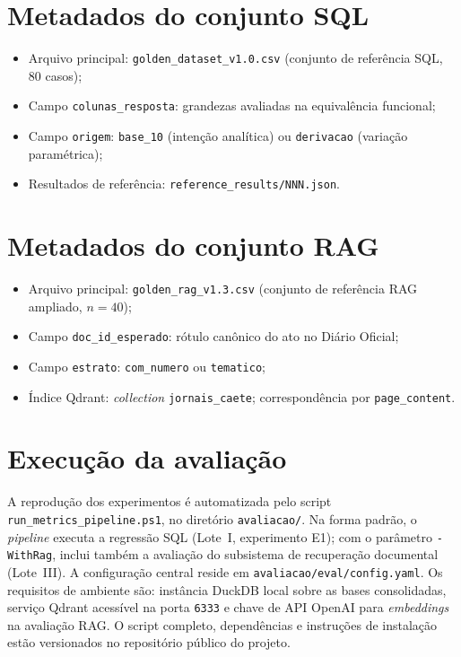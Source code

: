 \section{Metadados do conjunto SQL}

\begin{itemize}
    \item Arquivo principal: \texttt{golden\_dataset\_v1.0.csv} (conjunto de referência SQL, 80 casos);
    \item Campo \texttt{colunas\_resposta}: grandezas avaliadas na equivalência funcional;
    \item Campo \texttt{origem}: \texttt{base\_10} (intenção analítica) ou \texttt{derivacao} (variação paramétrica);
    \item Resultados de referência: \texttt{reference\_results/NNN.json}.
\end{itemize}

\section{Metadados do conjunto RAG}

\begin{itemize}
    \item Arquivo principal: \texttt{golden\_rag\_v1.3.csv} (conjunto de referência RAG ampliado, $n=40$);
    \item Campo \texttt{doc\_id\_esperado}: rótulo canônico do ato no Diário Oficial;
    \item Campo \texttt{estrato}: \texttt{com\_numero} ou \texttt{tematico};
    \item Índice Qdrant: \textit{collection} \texttt{jornais\_caete}; correspondência por \texttt{page\_content}.
\end{itemize}

\section{Execução da avaliação}

A reprodução dos experimentos é automatizada pelo script \texttt{run\_metrics\_pipeline.ps1}, no diretório \texttt{avaliacao/}. Na forma padrão, o \textit{pipeline} executa a regressão SQL (Lote~I, experimento E1); com o parâmetro \texttt{-WithRag}, inclui também a avaliação do subsistema de recuperação documental (Lote~III). A configuração central reside em \texttt{avaliacao/eval/config.yaml}. Os requisitos de ambiente são: instância DuckDB local sobre as bases consolidadas, serviço Qdrant acessível na porta \texttt{6333} e chave de API OpenAI para \textit{embeddings} na avaliação RAG. O script completo, dependências e instruções de instalação estão versionados no repositório público do projeto.
